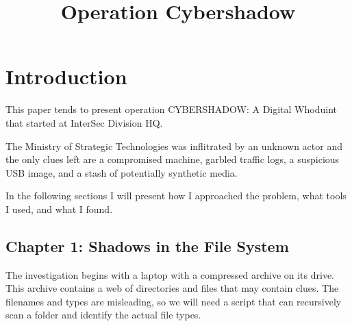 \documentclass[pdflatex,sn-mathphys-num]{sn-jnl}
\begin{document}
\title[Operation Cybershadow]{Operation Cybershadow}

\author*{ }




\maketitle

\section{Introduction}\label{introduction}

\par This paper tends to present operation CYBERSHADOW\@: A Digital Whoduint that started at InterSec Division HQ.

\par The Ministry of Strategic Technologies was inflitrated by an unknown actor and the only clues left are a
compromised machine, garbled traffic logs, a suspicious USB image, and a stash of potentially synthetic media.

\par In the following sections I will present how I approached the problem, what tools I used, and what I found.

\subsection{Chapter 1: Shadows in the File System}\label{chapter1_introduction}

\par The investigation begins with a laptop with a compressed archive on its drive. This archive contains a web of
directories and files that may contain clues. The filenames and types are misleading, so we will need a script that can
recursively scan a folder and identify the actual file types.
\end{document}
